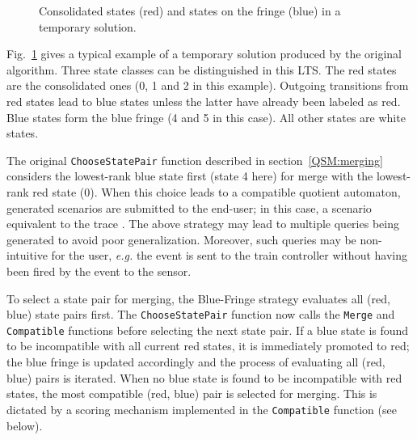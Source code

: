 \begin{figure}
\centering
{}
\caption{Consolidated states (red) and states on the fringe (blue) in a temporary solution\label{Fig:BlueFringe}.}
\end{figure}

Fig.~\ref{Fig:BlueFringe} gives a typical example of a temporary solution produced by the original algorithm. Three state classes can be distinguished in this LTS. The red states are the consolidated ones (0, 1 and 2 in this example). Outgoing transitions from red states lead to blue states unless the latter have already been labeled as red. Blue states form the blue fringe (4 and 5 in this case). All other states are white states. 

The original \texttt{ChooseStatePair} function described in section~\ref{QSM:merging} considers the lowest-rank blue state first (state 4 here) for merge with the lowest-rank red state (0). When this choice leads to a compatible quotient automaton, generated scenarios are submitted to the end-user; in this case, a scenario equivalent to the trace . The above strategy may lead to multiple queries being generated to avoid poor generalization. Moreover, such queries may be non-intuitive for the user, \textit{e.g.} the  event is sent to the train controller without having been fired by the  event to the sensor.

To select a state pair for merging, the Blue-Fringe strategy evaluates all (red, blue) state pairs first. The \texttt{ChooseStatePair} function now calls the \texttt{Merge} and \texttt{Compatible} functions before selecting the next state pair. If a blue state is found to be incompatible with all current red states, it is immediately promoted to red; the blue fringe is updated accordingly and the process of evaluating all (red, blue) pairs is iterated. When no blue state is found to be incompatible with red states, the most compatible (red, blue) pair is selected for merging. This is dictated by a scoring mechanism implemented in the \texttt{Compatible} function (see below).

